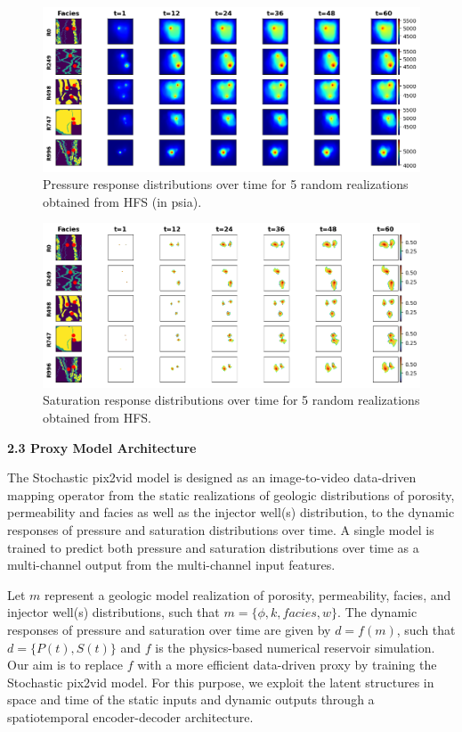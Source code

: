 \documentclass[10pt, twoside]{article}
\begin{document}
\begin{figure}[t]
    \centering
    \includegraphics[width=16cm]{figures/pres_response.png}
    \caption{Pressure response distributions over time for 5 random realizations obtained from HFS (in psia).}
    \label{pres_response}
\end{figure}

\begin{figure}[t]
    \centering
    \includegraphics[width=16cm]{figures/sat_mask_response.png}
    \caption{Saturation response distributions over time for 5 random realizations obtained from HFS.}
    \label{sat_response}
\end{figure}

\textbf{2.3 Proxy Model Architecture} 

The Stochastic pix2vid model is designed as an image-to-video data-driven mapping operator from the static realizations of geologic distributions of porosity, permeability and facies as well as the injector well(s) distribution, to the dynamic responses of pressure and saturation distributions over time. A single model is trained to predict both pressure and saturation distributions over time as a multi-channel output from the multi-channel input features.

Let $m$ represent a geologic model realization of porosity, permeability, facies, and injector well(s) distributions, such that $m = \{\phi,k,facies,w\}$. The dynamic responses of pressure and saturation over time are given by $d=f(m)$, such that $d=\{P(t), S(t)\}$ and $f$ is the physics-based numerical reservoir simulation. Our aim is to replace $f$ with a more efficient data-driven proxy by training the Stochastic pix2vid model. For this purpose, we exploit the latent structures in space and time of the static inputs and dynamic outputs through a spatiotemporal encoder-decoder architecture. 
\end{document}

